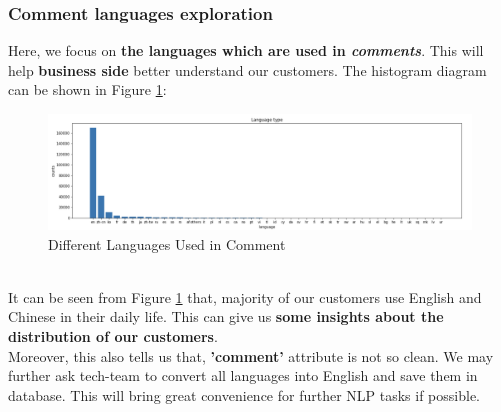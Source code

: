 \documentclass{article}
\begin{document}
	\subsubsection{Comment languages exploration}
	Here, we focus on\textbf{ the languages which are used in \textit{comments}}. This will help \textbf{business side} better understand our customers. The histogram diagram can be shown in Figure \ref{fig:008}:
	\begin{figure}[h]
		\centering
		\includegraphics[width=.6\textheight]{language_type.png}
		\caption{Different Languages Used in Comment}
		\label{fig:008}
	\end{figure}
	\\
	It can be seen from Figure \ref{fig:008} that, majority of our customers use English and Chinese in their daily life. This can give us \textbf{some insights about the distribution of our customers}. 
	\vspace{3pt}
	\\
	Moreover, this also tells us that, \textbf{'comment'} attribute is not so clean. We may further ask tech-team to convert all languages into English and save them in database. This will bring great convenience for further NLP tasks if possible.
\end{document}
